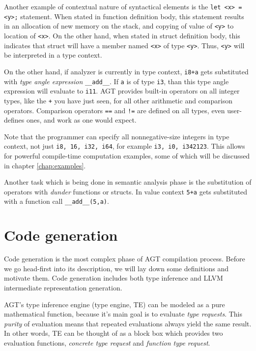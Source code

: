 \documentclass[times, utf8, diplomski]{fer}
\theoremstyle{definition}
\newcommand{\pythoncode}[3]{
    
}
\begin{document}
\pythoncode{\resdir/compiler/initex.py}{semana}{Semantic analysis rule example}

Another example of contextual nature of syntactical elements is the \texttt{let <x> = <y>;} statement.
When stated in function definition body, this statement results in an allocation 
of new memory on the stack,
and copying of value of \texttt{<y>} to location of \texttt{<x>}.
On the other hand, when stated in struct definition body, this indicates that
struct will have a member named \texttt{<x>} of type \texttt{<y>}. 
Thus, \texttt{<y>} will be interpreted in a type context.

On the other hand,
if analyzer is currently in type context, \texttt{i8+a} gets substituted with
\textit{type angle expression} \texttt{\_\_add\_\_<i8, a>}. If \texttt{a} is of type \texttt{i3},
than this type angle expression will evaluate to \texttt{i11}. AGT provides built-in operators
on all integer types, like the \texttt{+} you have just seen, for all other arithmetic and
comparison operators. Comparison operators \texttt{==} and \texttt{!=} are defined on all types, 
even user-defines ones, and work as one would expect.

Note that the programmer can specify all nonnegative-size 
integers in type context, not just \texttt{i8, 16, i32, i64},
for example \texttt{i3, i0, i342123}.
This allows for powerful compile-time computation examples, 
some of which will be discussed in chapter \ref{chap:examples}.

Another task which is being done in semantic analysis phase is the substitution of operators with 
\textit{dunder} functions or structs. In value context \texttt{5+a} gets
substituted with a function call \texttt{\_\_add\_\_(5,a)}. 


\section{Code generation}\label{sect:codegen}

Code generation is the most complex phase of AGT compilation process.
Before we go head-first into its description, we will lay down some definitions
and motivate them. Code generation includes both type inference and LLVM intermediate representation
generation. 

AGT's type inference engine (type engine, TE) can be modeled as a 
pure mathematical function, because it's main goal is to evaluate \textit{type requests}.
This \textit{purity} of evaluation means that repeated evaluations always yield the same result.
In other words, TE can be thought of as a block box which provides two evaluation functions,
\textit{concrete type request} and \textit{function type request}.
\end{document}
